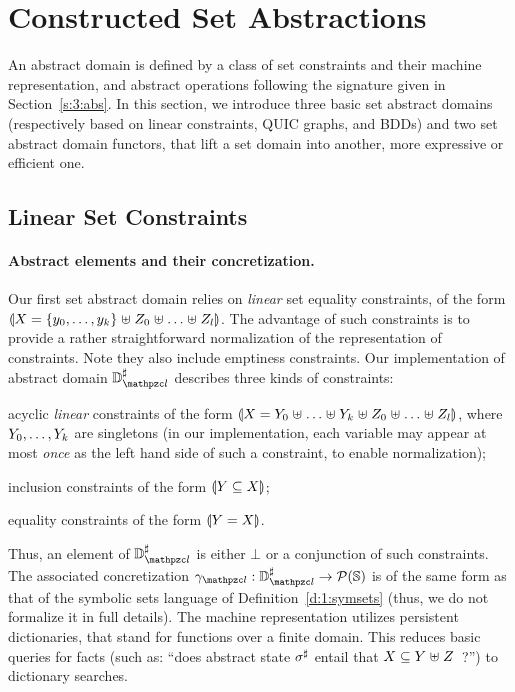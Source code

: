 \section{Constructed Set Abstractions}
\label{sec:constructed} \label{s:4:domains}
An abstract domain is defined by a class of set constraints and their machine
representation, and abstract operations following the signature given in
Section~\ref{s:3:abs}.
In this section, we introduce three basic set abstract domains (respectively
based on linear constraints, QUIC graphs, and BDDs) and two set abstract
domain functors, that lift a set domain into another, more expressive or
efficient one.

\subsection{Linear Set Constraints}
\label{s:4:1:lin}
\newcommand{\adomlin}{\adom_{\zcl}}
\newcommand{\gammalin}{\gamma_{\zcl}}
\paragraph{Abstract elements and their concretization.}
Our first set abstract domain relies on {\em linear} set equality
constraints, of the form \( \llparenthesis X = \{ y_0, \ldots, y_k \} \mathrel{\uplus}
  Z_0 \mathrel{\uplus} \ldots \mathrel{\uplus} Z_l \rrparenthesis \).
The advantage of such constraints is to provide a rather straightforward
normalization of the representation of constraints.
Note they also include emptiness constraints.
Our implementation of abstract domain \( \adomlin \) describes three kinds
of constraints:
\begin{compactitem}
\item acyclic {\em linear} constraints of the form \( \llparenthesis X =
    Y_0 \mathrel{\uplus} \ldots \mathrel{\uplus} Y_k \mathrel{\uplus} Z_0 \mathrel{\uplus} \ldots
    \mathrel{\uplus} Z_l \rrparenthesis \), where \( Y_0, \ldots, Y_k \) are
  singletons (in our implementation, each variable may appear at most
  {\em once} as the left hand side of such a constraint, to enable
  normalization);
\item inclusion constraints of the form \( \llparenthesis Y \subseteq X \rrparenthesis \);
\item equality constraints of the form \( \llparenthesis Y = X \rrparenthesis \).
\end{compactitem}
Thus, an element of \( \adomlin \) is either \( \bot \) or a conjunction of
such constraints.
The associated concretization \( \gammalin: \adomlin \rightarrow
\partsof{\states} \) is of the same form as that of the symbolic sets
language of Definition~\ref{d:1:symsets} (thus, we do not formalize it
in full details).
The machine representation utilizes persistent dictionaries, that stand
for functions over a finite domain.
This reduces basic queries for facts (such as: ``does abstract state
\( {\sigma}^{\sharp} \) entail that \( X \subseteq Y \mathrel{\uplus} Z
\)~?'') to dictionary searches.

